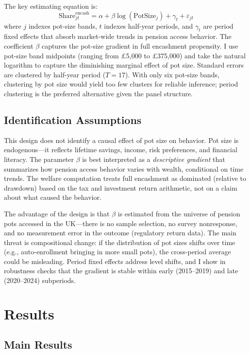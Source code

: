 \documentclass[12pt]{article}
\begin{document}
The key estimating equation is:
\begin{equation}
\text{Share}_{jt}^{\text{encash}} = \alpha + \beta \log(\text{PotSize}_j) + \gamma_t + \varepsilon_{jt}
\end{equation}
where $j$ indexes pot-size bands, $t$ indexes half-year periods, and $\gamma_t$ are period fixed effects that absorb market-wide trends in pension access behavior. The coefficient $\beta$ captures the pot-size gradient in full encashment propensity. I use pot-size band midpoints (ranging from \pounds5,000 to \pounds375,000) and take the natural logarithm to capture the diminishing marginal effect of pot size. Standard errors are clustered by half-year period ($T = 17$). With only six pot-size bands, clustering by pot size would yield too few clusters for reliable inference; period clustering is the preferred alternative given the panel structure.

\subsection{Identification Assumptions}

This design does not identify a causal effect of pot size on behavior. Pot size is endogenous---it reflects lifetime savings, income, risk preferences, and financial literacy. The parameter $\beta$ is best interpreted as a \textit{descriptive gradient} that summarizes how pension access behavior varies with wealth, conditional on time trends. The welfare computation treats full encashment as dominated (relative to drawdown) based on the tax and investment return arithmetic, not on a claim about what caused the behavior.

The advantage of the design is that $\beta$ is estimated from the universe of pension pots accessed in the UK---there is no sample selection, no survey nonresponse, and no measurement error in the outcome (regulatory return data). The main threat is compositional change: if the distribution of pot sizes shifts over time (e.g., auto-enrollment bringing in more small pots), the cross-period average could be misleading. Period fixed effects address level shifts, and I show in robustness checks that the gradient is stable within early (2015--2019) and late (2020--2024) subperiods.

\section{Results}

\subsection{Main Results}
\end{document}
